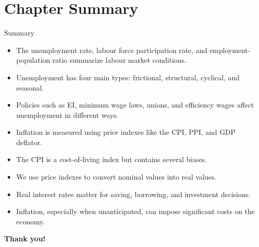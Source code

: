\documentclass[aspectratio=169]{beamer}
\begin{document}
\section*{Chapter Summary}

\begin{frame}{Summary}
\transfade
\begin{itemize}[<+->]
  \item The unemployment rate, labour force participation rate, and employment-population ratio summarize labour market conditions.
  \item Unemployment has four main types: frictional, structural, cyclical, and seasonal.
  \item Policies such as EI, minimum wage laws, unions, and efficiency wages affect unemployment in different ways.
  \item Inflation is measured using price indexes like the CPI, PPI, and GDP deflator.
  \item The CPI is a cost-of-living index but contains several biases.
  \item We use price indexes to convert nominal values into real values.
  \item Real interest rates matter for saving, borrowing, and investment decisions.
  \item Inflation, especially when unanticipated, can impose significant costs on the economy.
\end{itemize}
\end{frame}

\begin{frame}
\centering
\Huge \textbf{Thank you!}
\end{frame}
\end{document}
